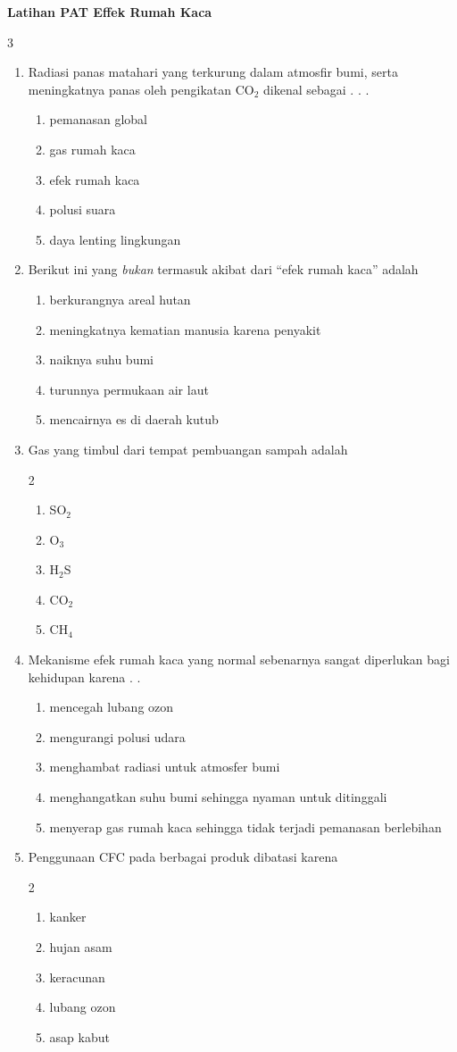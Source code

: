 \documentclass[10pt,a4paper]{extarticle}
\newcommand*\pilgan[1]{
\begin{enumerate}[label=\Alph*., itemsep=0pt,topsep=0pt,leftmargin=*,align=Center] #1 
\end{enumerate}}
\newcommand{\pilgani}[1]{                            \vspace{-0.3cm}\begin{multicols}{2}
 \begin{enumerate}[label=\Alph*., itemsep=0pt,topsep=0pt,leftmargin=*,align=Center]#1                     \end{enumerate}
 \phantom{ini cuma sapi, wedus, dan ayam}
 \end{multicols}}
\begin{document}
 \textbf{Latihan PAT Effek Rumah Kaca} \phantom{ini nama siswa yang aaamengerjakan soal kuis ini }  

\begin{multicols*}{3}\raggedcolumns

\begin{enumerate}
\item Radiasi panas matahari yang terkurung dalam atmosfir bumi, serta meningkatnya panas oleh pengikatan CO$_2$ dikenal sebagai . . . 
\pilgan{
\item pemanasan global
\item gas rumah kaca
\item efek rumah kaca
\item polusi suara
\item daya lenting lingkungan}

\item Berikut ini yang \textit{bukan} termasuk akibat dari ``efek rumah kaca'' adalah
\pilgan{
\item berkurangnya areal hutan
\item meningkatnya kematian manusia karena penyakit
\item naiknya suhu bumi
\item turunnya permukaan air laut
\item mencairnya es di daerah kutub}

\item Gas yang timbul dari tempat pembuangan sampah adalah 
\pilgani{
\item SO$_2$
\item O$_3$
\item H$_2$S
\item CO$_2$
\item CH$_4$
}

\item Mekanisme efek rumah kaca yang normal sebenarnya sangat diperlukan bagi kehidupan karena . .
\pilgan{
\item mencegah lubang ozon
\item mengurangi polusi udara
\item menghambat radiasi untuk atmosfer bumi
\item menghangatkan suhu bumi sehingga nyaman untuk ditinggali
\item menyerap gas rumah kaca sehingga tidak terjadi pemanasan berlebihan }

\item Penggunaan CFC pada berbagai produk dibatasi karena
\pilgani{
\item kanker
\item hujan asam
\item keracunan
\item lubang ozon
\item asap kabut}



\end{enumerate}
\end{multicols*}
\end{document}
